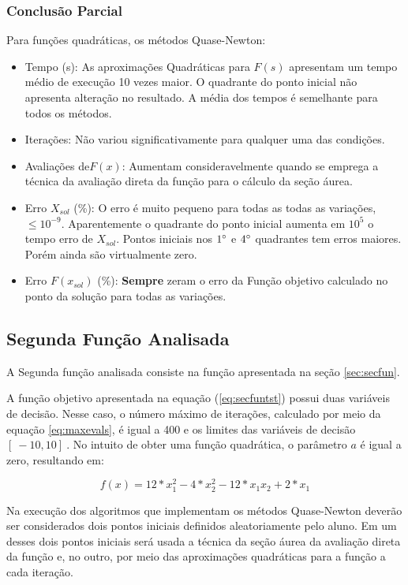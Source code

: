         \subsubsection{Conclusão Parcial}
            Para funções quadráticas, os métodos Quase-Newton:
            \begin{itemize}
            \item {Tempo (s):} As aproximações Quadráticas para $F(s)$ apresentam um tempo médio de execução 10 vezes maior. O quadrante do ponto inicial não apresenta alteração no resultado. A média dos tempos é semelhante para todos os métodos.
            \item {Iterações:} Não variou significativamente para qualquer uma das condições.
            \item {Avaliações de$F(x)$:} Aumentam consideravelmente quando se emprega a técnica da avaliação direta da função para o cálculo da seção áurea. 
            \item {Erro $X_{sol}$ (\%):} O erro é muito pequeno para todas as todas as variações, $\leq 10^{-9}$. Aparentemente o quadrante do ponto inicial aumenta em $10^5$ o tempo erro de $X_{sol}$. Pontos iniciais nos $1\degree$ e $4\degree$ quadrantes tem erros maiores. Porém ainda são virtualmente zero.
            \item {Erro $F(x_{sol})$ (\%):} \textbf{Sempre} zeram o erro da Função objetivo calculado no ponto da solução para todas as variações. 
            \end{itemize}
            
    \subsection{Segunda Função Analisada}

    A Segunda função analisada consiste na função apresentada na seção \ref{sec:secfun}.

    A função objetivo apresentada na equação (\ref{eq:secfuntst}) possui duas variáveis de decisão. Nesse caso, o número máximo de iterações, calculado por meio da equação \ref{eq:maxevals}, é igual a 400 e os limites das variáveis de decisão $[\ -10 , 10 ]\ $. No intuito de obter uma função quadrática, o parâmetro $a$ é igual a zero, resultando em:

    \begin{equation*} 
        f(x) = 12*x_1^2 - 4*x_2^2 - 12*x_1x_2 + 2*x_1
    \end{equation*}
    
    Na execução dos algoritmos que implementam os métodos Quase-Newton deverão ser considerados dois pontos iniciais definidos aleatoriamente pelo aluno. Em um desses dois pontos iniciais será usada a técnica da seção áurea da avaliação direta da função e, no outro, por meio das aproximações quadráticas para a função a cada iteração. 

